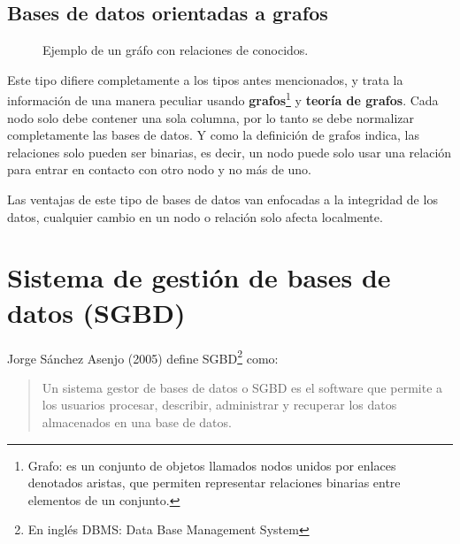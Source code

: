 \subsection{Bases de datos orientadas a grafos}

\begin{figure}[!h]
    \centering
     \caption[Bases de datos en grafo]{Ejemplo de un gr\'afo con relaciones de conocidos.}
\end{figure}

Este tipo difiere completamente a los tipos antes mencionados, y trata la informaci\'on de una manera peculiar usando \textbf{grafos}\footnote{Grafo: es un conjunto de objetos llamados nodos unidos por enlaces denotados aristas, que permiten representar relaciones binarias entre elementos de un conjunto.} y \textbf{teor\'ia de grafos}. Cada nodo solo debe contener una sola columna, por lo tanto se debe normalizar completamente las bases de datos. Y como la definici\'on de grafos indica, las relaciones solo pueden ser binarias, es decir, un nodo puede solo usar una relaci\'on para entrar en contacto con otro nodo y no m\'as de uno.

Las ventajas de este tipo de bases de datos van enfocadas a la integridad de los datos, cualquier cambio en un nodo o relaci\'on solo afecta localmente.

\section{Sistema de gesti\'on de bases de datos (SGBD)}

Jorge Sánchez Asenjo (2005) define SGBD\footnote{En ingl\'es DBMS: Data Base Management System} como:

\begin{quote}
Un sistema gestor de bases de datos o SGBD es el software que permite a los usuarios procesar, describir, administrar y recuperar los datos almacenados en una base de datos. 
\end{quote}

